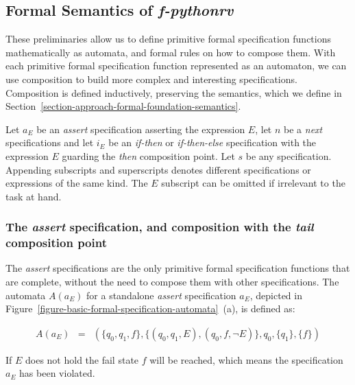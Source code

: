 




\subsection{Formal Semantics of \textit{f-pythonrv}}
\label{section-approach-composition}
\lstset{language=Python,numbers=none}

These preliminaries allow us to define primitive formal specification functions
mathematically as automata, and formal rules on how to compose them. With each
primitive formal specification function represented as an automaton, we can use
composition to build more complex and interesting specifications. Composition
is defined inductively, preserving the semantics, which we define in
Section~\ref{section-approach-formal-foundation-semantics}.

Let $a_E$ be an \textit{assert} specification asserting the
expression $E$, let $n$ be a \textit{next} specifications and let $i_E$ be an
\textit{if-then} or \textit{if-then-else} specification with the expression $E$
guarding the \textit{then} composition point. Let $s$ be any specification.
Appending subscripts and superscripts denotes different specifications or
expressions of the same kind. The $E$ subscript can be omitted if irrelevant to
the task at hand.

\subsubsection{The \textit{assert} specification, and composition with the
\textit{tail} composition point}

The \textit{assert} specifications are the only primitive formal specification
functions that are complete, without the need to compose them with other
specifications. The automata $A(a_E)$ for a standalone \textit{assert}
specification $a_E$, depicted in
Figure~\ref{figure-basic-formal-specification-automata}~(a), is defined as:

\medskip
\[
  \begin{array}{rcl}
    A(a_E) & = & (\{q_0, q_1, f\}, \{(q_0, q_1, E), (q_0, f, \neg E)\}, q_0, \{q_1\}, \{f\})
  \end{array}
\]
\medskip

If $E$ does not hold the fail state $f$ will be reached, which means the
specification $a_E$ has been violated.

